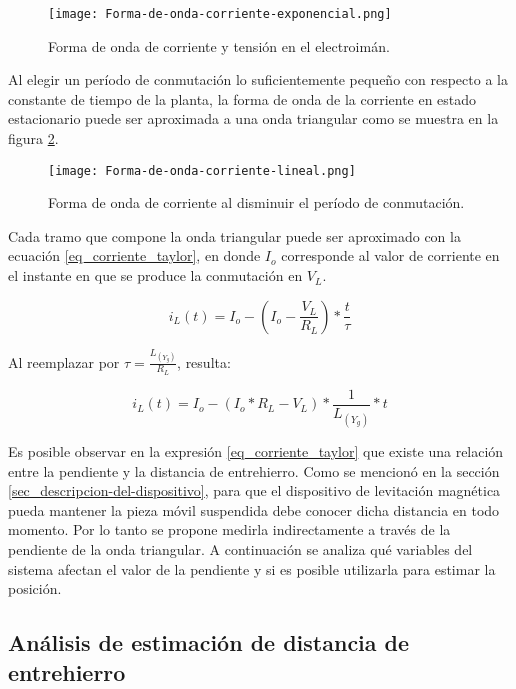 \begin{figure}[H]
	\centering
	\texttt{[image: Forma-de-onda-corriente-exponencial.png]}
	\caption{Forma de onda de corriente y tensión en el electroimán.}
	\label{fig:img_corriente_exponencial}
\end{figure}

Al elegir un período de conmutación lo suficientemente pequeño con respecto a la constante de tiempo de la planta, la forma de onda de la corriente en estado estacionario puede ser aproximada a una onda triangular como se muestra en la figura \ref{fig:img_corriente_lineal}. 

\begin{figure}[H]
	\centering
	\texttt{[image: Forma-de-onda-corriente-lineal.png]}
	\caption{Forma de onda de corriente al disminuir el período de conmutación.}
	\label{fig:img_corriente_lineal}
\end{figure}

Cada tramo que compone la onda triangular puede ser aproximado con la ecuación \ref{eq_corriente_taylor}, en donde $I_o$ corresponde al valor de corriente en el instante en que se produce la conmutación en $V_L$.

\begin{equation}
	i_L(t)=I_o -  (I_o-\frac{V_L}{R_L})*\frac{t}{\tau}
\end{equation}

Al reemplazar por $\tau=\frac{L_{(Y_g)}}{R_L}$, resulta:

\begin{equation} \label{eq_corriente_taylor}
	i_L(t)=I_o -  (I_o*R_L-V_L)*\frac{1}{L_{(Y_g)}}*t
\end{equation}

Es posible observar en la expresión \ref{eq_corriente_taylor} que existe una relación entre la pendiente y la distancia de entrehierro. Como se mencionó en la sección \ref{sec_descripcion-del-dispositivo}, para que el dispositivo de levitación magnética pueda mantener la pieza móvil suspendida debe conocer dicha distancia en todo momento. Por lo tanto se propone medirla indirectamente a través de la pendiente de la onda triangular. A continuación se analiza qué variables del sistema afectan el valor de la pendiente y si es posible utilizarla para estimar la posición.

\subsection{Análisis de estimación de distancia de entrehierro} \label{sec_analisis_estimacion}

